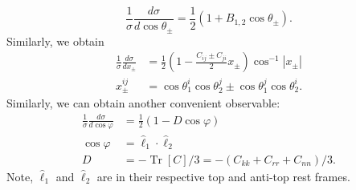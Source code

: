 \[
\frac{1}{\sigma} \frac{d \sigma}{d \cos \theta_{ \pm}}=\frac{1}{2}\left(1+B_{1,2} \cos \theta_{ \pm}\right).
\]
Similarly, we obtain
\[
\begin{aligned}
\frac{1}{\sigma} \frac{d \sigma}{d x_{ \pm}} & =\frac{1}{2}\left(1-\frac{C_{i j} \pm C_{j i}}{2} x_{ \pm}\right) \cos ^{-1}\left|x_{ \pm}\right| \\
x_{ \pm}^{i j} & =\cos \theta_1^i \cos \theta_2^j \pm \cos \theta_1^j \cos \theta_2^i .
\end{aligned}
\]
Similarly, we can obtain another convenient observable:
\[
\begin{aligned}
\frac{1}{\sigma} \frac{d \sigma}{d \cos \varphi}&=\frac{1}{2}(1-D \cos \varphi)
\\
\cos \varphi &= \hat \ell_1 \cdot \hat \ell_2 \\
D&=-\operatorname{Tr}[C] / 3=-\left(C_{k k}+C_{r r}+C_{n n}\right) / 3 .
\end{aligned}
\]
Note, $\hat \ell_1$ and $\hat \ell_2$ are in their respective top and anti-top rest frames.

